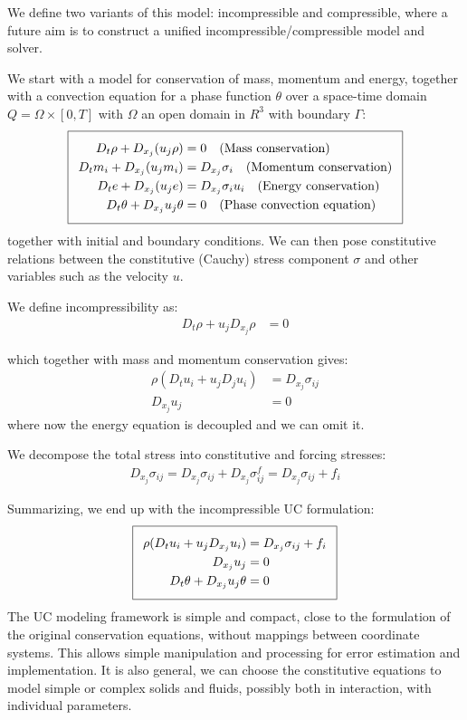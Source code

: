 We define two variants of this model: incompressible and compressible,
where a future aim is to construct a unified
incompressible/compressible model and solver.

We start with a model for conservation of mass, momentum and energy,
together with a convection equation for a phase function $\theta$ over
a space-time domain $Q = \Omega \times [0, T]$ with $\Omega$ an open
domain in $R^3$ with boundary $\Gamma$:
\begin{equation}
  \addtolength{\fboxsep}{5pt}
  \boxed{
    \begin{split}\label{eq:TotalModel}
      D_t \rho + D_{x_j} (u_j \rho) &= 0
      \quad \text{(Mass conservation)}\\
      D_t m_i + D_{x_j} (u_j m_i) &= D_{x_j} \sigma_i
      \quad \text{(Momentum conservation)}\\
      D_t e + D_{x_j} (u_j e) &= D_{x_j} \sigma_i u_i
      \quad \text{(Energy conservation)}\\
      D_t \theta + D_{x_j} u_j \theta &= 0
      \quad \text{(Phase convection equation)}
    \end{split}
  }
\end{equation}
together with initial and boundary conditions. We can then pose
constitutive relations between the constitutive (Cauchy) stress
component $\sigma$ and other variables such as the velocity $u$.

We define incompressibility as:
\begin{align*}
D_t \rho + u_j D_{x_j} \rho &= 0
\end{align*}

which together with mass and momentum conservation gives:
\begin{align*}
\rho(D_t u_i + u_j D_j u_i) &= D_{x_j} \sigma_{ij}\\
D_{x_j} u_j &= 0
\end{align*}
where now the energy equation is decoupled and we can omit it.

We decompose the total stress into constitutive and forcing stresses:
\begin{align*}
D_{x_j} \sigma_{ij} = D_{x_j} \sigma_{ij} + D_{x_j} \sigma^f_{ij} =
D_{x_j} \sigma_{ij} + f_i
\end{align*}

Summarizing, we end up with the incompressible UC formulation:
\begin{equation}
  \addtolength{\fboxsep}{5pt}
  \boxed{
    \begin{split}\label{eq:TotalUC}
      \rho(D_t u_i + u_j D_{x_j} u_i) &= D_{x_j} \sigma_{ij} + f_i\\
      D_{x_j} u_j &= 0\\
      D_t \theta + D_{x_j} u_j \theta &= 0
    \end{split}
  }
\end{equation}
The UC modeling framework is simple and compact, close to the
formulation of the original conservation equations, without mappings
between coordinate systems. This allows simple manipulation and
processing for error estimation and implementation. It is also
general, we can choose the constitutive equations to model simple or
complex solids and fluids, possibly both in interaction, with
individual parameters.

